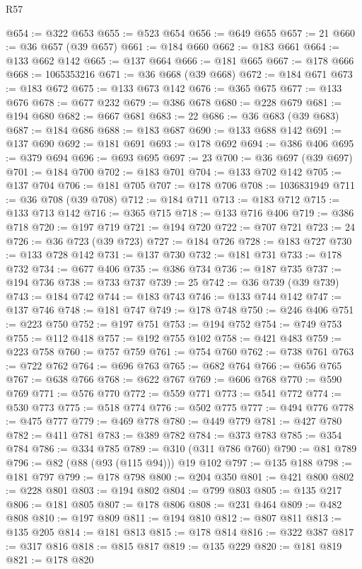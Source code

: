 \begin{lexlean}{R57}
\begin{coremodule}
@654 := @322 @653
@655 := @523 @654
@656 := @649 @655
@657 := 21
@660 := @36 @657 (@39 @657)
@661 := @184 @660
@662 := @183 @661
@664 := @133 @662 @142
@665 := @137 @664
@666 := @181 @665
@667 := @178 @666
@668 := 1065353216
@671 := @36 @668 (@39 @668)
@672 := @184 @671
@673 := @183 @672
@675 := @133 @673 @142
@676 := @365 @675
@677 := @133 @676
@678 := @677 @232
@679 := @386 @678
@680 := @228 @679
@681 := @194 @680
@682 := @667 @681
@683 := 22
@686 := @36 @683 (@39 @683)
@687 := @184 @686
@688 := @183 @687
@690 := @133 @688 @142
@691 := @137 @690
@692 := @181 @691
@693 := @178 @692
@694 := @386 @406
@695 := @379 @694
@696 := @693 @695
@697 := 23
@700 := @36 @697 (@39 @697)
@701 := @184 @700
@702 := @183 @701
@704 := @133 @702 @142
@705 := @137 @704
@706 := @181 @705
@707 := @178 @706
@708 := 1036831949
@711 := @36 @708 (@39 @708)
@712 := @184 @711
@713 := @183 @712
@715 := @133 @713 @142
@716 := @365 @715
@718 := @133 @716 @406
@719 := @386 @718
@720 := @197 @719
@721 := @194 @720
@722 := @707 @721
@723 := 24
@726 := @36 @723 (@39 @723)
@727 := @184 @726
@728 := @183 @727
@730 := @133 @728 @142
@731 := @137 @730
@732 := @181 @731
@733 := @178 @732
@734 := @677 @406
@735 := @386 @734
@736 := @187 @735
@737 := @194 @736
@738 := @733 @737
@739 := 25
@742 := @36 @739 (@39 @739)
@743 := @184 @742
@744 := @183 @743
@746 := @133 @744 @142
@747 := @137 @746
@748 := @181 @747
@749 := @178 @748
@750 := @246 @406
@751 := @223 @750
@752 := @197 @751
@753 := @194 @752
@754 := @749 @753
@755 := @112 @418
@757 := @192 @755 @102
@758 := @421 @483
@759 := @223 @758
@760 := @757 @759
@761 := @754 @760
@762 := @738 @761
@763 := @722 @762
@764 := @696 @763
@765 := @682 @764
@766 := @656 @765
@767 := @638 @766
@768 := @622 @767
@769 := @606 @768
@770 := @590 @769
@771 := @576 @770
@772 := @559 @771
@773 := @541 @772
@774 := @530 @773
@775 := @518 @774
@776 := @502 @775
@777 := @494 @776
@778 := @475 @777
@779 := @469 @778
@780 := @449 @779
@781 := @427 @780
@782 := @411 @781
@783 := @389 @782
@784 := @373 @783
@785 := @354 @784
@786 := @334 @785
@789 := @310 (@311 @786 @760)
@790 := @81 @789
@796 := @82 (@88 (@93 (@115 @94))) @19 @102
@797 := @135 @188
@798 := @181 @797
@799 := @178 @798
@800 := @204 @350
@801 := @421 @800
@802 := @228 @801
@803 := @194 @802
@804 := @799 @803
@805 := @135 @217
@806 := @181 @805
@807 := @178 @806
@808 := @231 @464
@809 := @482 @808
@810 := @197 @809
@811 := @194 @810
@812 := @807 @811
@813 := @135 @205
@814 := @181 @813
@815 := @178 @814
@816 := @322 @387
@817 := @317 @816
@818 := @815 @817
@819 := @135 @229
@820 := @181 @819
@821 := @178 @820

\end{coremodule}
\end{lexlean}
